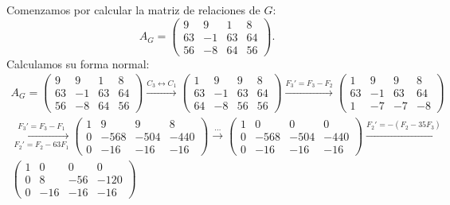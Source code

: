 \begin{ejercicio}
    Comenzamos por calcular la matriz de relaciones de $G$:
    \begin{equation*}
        A_G = \begin{pmatrix}
            9 & 9 & 1 & 8 \\
            63 & -1 & 63 & 64 \\
            56 & -8 & 64 & 56
        \end{pmatrix}.
    \end{equation*}
    Calculamos su forma normal:
    \begin{multline*}
        A_G = \begin{pmatrix}
            9 & 9 & 1 & 8 \\
            63 & -1 & 63 & 64 \\
            56 & -8 & 64 & 56
        \end{pmatrix}
        \xrightarrow{C_3\leftrightarrow C_1}
        \begin{pmatrix}
            1 & 9 & 9 & 8 \\
            63 & -1 & 63 & 64 \\
            64 & -8 & 56 & 56
        \end{pmatrix}
        \xrightarrow{F_3'=F_3-F_2}
        \begin{pmatrix}
            1 & 9 & 9 & 8 \\
            63 & -1 & 63 & 64 \\
            1 & -7 & -7 & -8
        \end{pmatrix}\\
        \xrightarrow[F_2'=F_2-63F_1]{F_3'=F_3-F_1}
        \begin{pmatrix}
            1 & 9 & 9 & 8 \\
            0 & -568 & -504 & -440 \\
            0 & -16 & -16 & -16
        \end{pmatrix}
        \xrightarrow{\dots}
        \begin{pmatrix}
            1 & 0 & 0 & 0 \\
            0 & -568 & -504 & -440 \\
            0 & -16 & -16 & -16
        \end{pmatrix}
        \xrightarrow{F_2'=-(F_2-35F_3)}\\
        \begin{pmatrix}
            1 & 0 & 0 & 0 \\
            0 & 8 & -56 & -120 \\
            0 & -16 & -16 & -16

\end{pmatrix}
\end{multline*}
\end{ejercicio}
